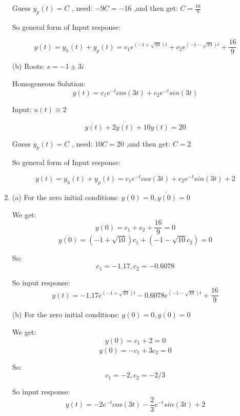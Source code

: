 \documentclass[12pt]{article}
\begin{document}
\begin{enumerate}[label=\roman*.]
    Guess $y_p(t) = C$ , need: $-9C = -16$ ,and then get: $C = \frac{16}{9}$

    So general form of Input response:

    \[y(t) = y_h(t) + y_p(t) = c_1e^{(-1+\sqrt{10})t} + c_2e^{(-1-\sqrt{10})t} + 
        \frac{16}{9}\]

    (b)
    Roots: $s = -1 \pm 3i$

    Homogeneous Solution: 
    \[y(t) = c_1e^{-t}cos(3t) + c_2e^{-t}sin(3t)\]

    Input: $u(t) \equiv 2$

    \[\ddot{y(t)} + 2\dot{y(t)} + 10y(t) = 20\]

    Guess $y_p(t) = C$ , need: $10C = 20$ ,and then get: $C = 2$

    So general form of Input response:

    \[y(t) = y_h(t) + y_p(t) = c_1e^{-t}cos(3t) + c_2e^{-t}sin(3t) + 2\]

    \item (a)
    For the zero initial conditions: $y(0) = 0, \dot{y(0)} = 0$

    We get:
    \[y(0) = c_1 + c_2 + \frac{16}{9} = 0\]
    \[\dot{y(0)} = (-1+\sqrt{10})c_1 + (-1-\sqrt{10}c_2) = 0\]

    So:
    \[c_1 = -1.17, c_2 = -0.6078\]

    So input response:
    \[y(t) = -1.17e^{(-1+\sqrt{10})t} -0.6078e^{(-1-\sqrt{10})t} + 
        \frac{16}{9}\]


    (b)
    For the zero initial conditions: $y(0) = 0, \dot{y(0)} = 0$

    We get:
    \[y(0) = c_1 + 2 = 0\]
    \[\dot{y(0)} = -c_1 + 3c_2 = 0\]

    So:
    \[c_1 = -2, c_2 = -2/3\]

    So input response:
    \[y(t) = -2e^{-t}cos(3t) - \frac{2}{3}e^{-t}sin(3t) + 2\]


\end{enumerate}
\end{document}
